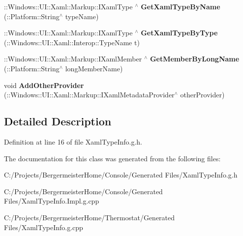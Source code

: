 \begin{DoxyCompactItemize}
\mbox{\label{class_xaml_type_info_1_1_info_provider_1_1_xaml_type_info_provider_a37556c5ef8fae3ce58b97c95b06c0ea9}} 
\+::Windows\+::\+U\+I\+::\+Xaml\+::\+Markup\+::\+I\+Xaml\+Type $^\wedge$ {\bfseries Get\+Xaml\+Type\+By\+Name} (\+::Platform\+::\+String$^\wedge$ type\+Name)
\item 
\mbox{\label{class_xaml_type_info_1_1_info_provider_1_1_xaml_type_info_provider_abd06d7d1579ab8549518aecfdaee2993}} 
\+::Windows\+::\+U\+I\+::\+Xaml\+::\+Markup\+::\+I\+Xaml\+Type $^\wedge$ {\bfseries Get\+Xaml\+Type\+By\+Type} (\+::Windows\+::\+U\+I\+::\+Xaml\+::\+Interop\+::\+Type\+Name t)
\item 
\mbox{\label{class_xaml_type_info_1_1_info_provider_1_1_xaml_type_info_provider_a340eaef5dc634cc6ea25f4b40c723c3a}} 
\+::Windows\+::\+U\+I\+::\+Xaml\+::\+Markup\+::\+I\+Xaml\+Member $^\wedge$ {\bfseries Get\+Member\+By\+Long\+Name} (\+::Platform\+::\+String$^\wedge$ long\+Member\+Name)
\item 
\mbox{\label{class_xaml_type_info_1_1_info_provider_1_1_xaml_type_info_provider_a9b6eea2111a9c404fc281b94389c5b87}} 
void {\bfseries Add\+Other\+Provider} (\+::Windows\+::\+U\+I\+::\+Xaml\+::\+Markup\+::\+I\+Xaml\+Metadata\+Provider$^\wedge$ other\+Provider)
\end{DoxyCompactItemize}


\subsection{Detailed Description}


Definition at line 16 of file Xaml\+Type\+Info.\+g.\+h.



The documentation for this class was generated from the following files\+:\begin{DoxyCompactItemize}
\item 
C\+:/\+Projects/\+Bergermeister\+Home/\+Console/\+Generated Files/Xaml\+Type\+Info.\+g.\+h\item 
C\+:/\+Projects/\+Bergermeister\+Home/\+Console/\+Generated Files/Xaml\+Type\+Info.\+Impl.\+g.\+cpp\item 
C\+:/\+Projects/\+Bergermeister\+Home/\+Thermostat/\+Generated Files/Xaml\+Type\+Info.\+g.\+cpp\end{DoxyCompactItemize}
